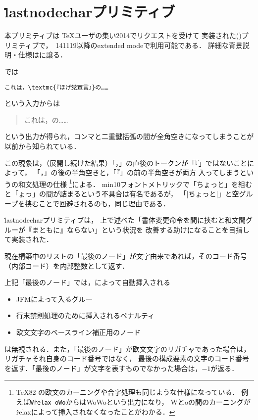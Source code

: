 \documentclass[a4paper,11pt,nomag]{jsarticle}
\begin{document}
\section{\.{lastnodechar}プリミティブ}
本プリミティブは
\TeX ユーザの集い2014でリクエストを受けて
実装された(\cite{pdfse})プリミティブで，\epTeX~141119以降のextended modeで利用可能である．
詳細な背景説明・仕様は\cite{lnc}に譲る．

\pTeX では
\begin{verbatim}
これは，\textmc{『ほげ党宣言』}の……
\end{verbatim}
という入力からは
\begin{quote}
これは，の……
\end{quote}
という出力が得られ，コンマと二重鍵括弧の間が全角空きになってしまうことが以前から知られている．

この現象は，（展開し続けた結果）「，」の直後のトークンが「『」ではないことによって，
「，」の後の半角空きと，「『」の前の半角空きが両方
入ってしまうという\pTeX の和文処理の仕様
\footnote{%
  \TeX82 の欧文のカーニングや合字処理も同じような仕様になっている．
  例えば\texttt{W\.{relax}\ oWo}からはW\relax oWoという出力になり，
  Wとoの間のカーニングが\.{relax}によって挿入されなくなったことがわかる．
}による．
min10フォントメトリックで「ちょっと」を組むと「ょっ」の間が詰まるという不具合は有名であるが，
「|ちょ{}っと|」と空グループを挟むことで回避されるのも，同じ理由である．

\medskip

\.{lastnodechar}プリミティブは，
上で述べた「書体変更命令を間に挟むと和文間グルーが『まともに』ならない」という状況を
改善する助けになることを目指して実装された．

\begin{cslist}
  現在構築中のリストの「最後のノード」が文字由来であれば，そのコード番号（内部コード）を内部整数として返す．

  上記「最後のノード」では，\pTeX によって自動挿入される
  \begin{itemize}
    \item JFMによって入るグルー
    \item 行末禁則処理のために挿入されるペナルティ
    \item 欧文文字のベースライン補正用のノード
  \end{itemize}
  は無視される．また，「最後のノード」が欧文文字のリガチャであった場合は，リガチャそれ自身のコード番号ではなく，
  最後の構成要素の文字のコード番号を返す．「最後のノード」が文字を表すものでなかった場合は，$-1$が返る．
\end{cslist}
\end{document}
